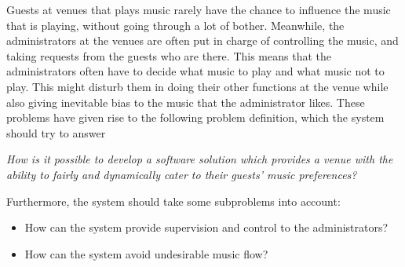 \label{sub:problemStatement}
Guests at venues that plays music rarely have the chance to influence the music that is playing, without going through a lot of bother. Meanwhile, the administrators at the venues are often put in charge of controlling the music, and taking requests from the guests who are there. This means that the administrators often have to decide what music to play and what music not to play. This might disturb them in doing their other functions at the venue while also giving inevitable bias to the music that the administrator likes.
These problems have given rise to the following problem definition, which the system should try to answer

\begin{center}
\textit{How is it possible to develop a software solution which provides a venue with the ability to fairly and dynamically cater to their guests' music preferences?}
\end{center}

Furthermore, the system should take some subproblems into account:
\begin{itemize}
\item How can the system provide supervision and control to the administrators?
\item How can the system avoid undesirable music flow?
\end{itemize}